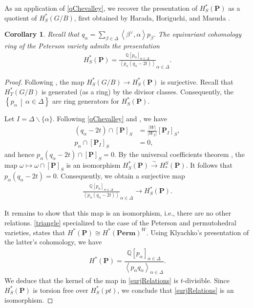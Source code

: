 \documentclass[10pt]{article}
\numberwithin{thm}{section}
\newtheorem{cor}[thm]{Corollary}
\theoremstyle{definition}
\theoremstyle{remark}
\newcommand{\Pet}{\ensuremath{\mathbf{P}}}
\newcommand{\Perm}{\ensuremath{\mathbf{Perm}}}
\newcommand{\Fl}{\ensuremath{G/B}}
\newcommand{\set}[2]{\left\{#1\,\middle\vert\,#2\right\}}
\begin{document}
As an application of \cref{qChevalley},
we recover the presentation of $H^*_S(\Pet)$ as a quotient of $H^*_S(\Fl)$,
first obtained by Harada, Horiguchi, and Masuda \cite{harada.horiguchi.masuda:Peterson}.
\begin{cor}%
\label{hhm}
Recall that $q_\alpha=\sum_{\beta\in\Delta}\left\langle\beta^\vee,\alpha\right\rangle p_\beta$.
The equivariant cohomology ring of the Peterson variety admits the presentation 
\begin{align*}
H^*_S(\Pet)=\frac{\mathbb Q[p_\alpha]_{\alpha\in\Delta}}{\left\langle p_\alpha(q_\alpha-2t)\right\rangle}_{\alpha\in\Delta}.
\end{align*}
\end{cor}
\begin{proof}
 Following \cite{drellich:monk}, the map $H^*_S(G/B)\to H^*_S(\Pet)$ is surjective.
Recall that $H^*_T(G/B)$ is generated (as a ring) by the divisor classes.
Consequently, the $\set{p_\alpha}{\alpha\in\Delta}$ are ring generators for $H^*_S(\Pet)$. 

Let $I=\Delta\backslash\{\alpha\}$. %
Following \cref{qChevalley} and \cite[Thm 6.5, 6.6]{gms:peterson}, we have
\begin{align*}
(q_\alpha-2t)\cap[\Pet]_S & =\frac{|W|}{|W_I|} [\Pet_I]_S,\\
p_\alpha\cap [\Pet_I]_S   & =0,
\end{align*}
and hence
$
p_\alpha(q_\alpha-2t)\cap[\Pet]_S=0.
$
By the universal coefficients theorem \cite[Ch 17, \S 3]{MR1702278}, the map 
$\omega\mapsto\omega\cap[\Pet]_S$ is an isomorphism $H^*_S(\Pet)\xrightarrow\sim H_*^S(\Pet)$.
It follows that $p_\alpha(q_\alpha-2t)=0$.
Consequently, we obtain a surjective map
\begin{align}
\label{surjRelations}
\frac{\mathbb Q[p_\alpha]_{\alpha\in\Delta}}{\left\langle p_\alpha(q_\alpha-2t)\right\rangle}_{\alpha\in\Delta}\longrightarrow H^*_S(\Pet).
\end{align}

It remains to show that this map is an isomorphism, i.e., there are no other relations.   \cref{triangle} specialized to the case of the Peterson and permutohedral varieties, states that $H^*(\Pet)\cong H^*(\Perm)^W$. Using Klyachko's presentation \cite[Thm 3]{klyachko85} of the latter's cohomology, 
we have
\begin{align*}
H^*(\Pet)=\dfrac{\mathbb Q[p_\alpha]_{\alpha\in\Delta}}{\left\langle p_\alpha q_\alpha\right\rangle_{\alpha\in\Delta}}.
\end{align*}
We deduce that the kernel of the map in \eqref{surjRelations} is $t$-divisible.
Since $H^*_S(\Pet)$ is torsion free over $H^*_S(pt)$,
we conclude that \eqref{surjRelations} is an isomorphism.
\end{proof}
\end{document}
